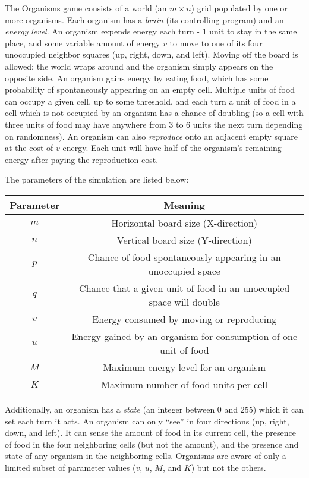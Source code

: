\documentclass[
10pt, %
letterpaper, %
oneside, %
headinclude,footinclude, %
english
]{article}
\begin{document}
The Organisms game consists of a world (an $m \times n$) grid populated by one or more organisms. Each organism has a \textit{brain} (its controlling program) and an \textit{energy level}. An organism expends energy each turn - 1 unit to stay in the same place, and some variable amount of energy $v$ to move to one of its four unoccupied neighbor squares (up, right, down, and left). Moving off the board is allowed; the world wraps around and the organism simply appears on the opposite side. An organism gains energy by eating food, which has some probability of spontaneously appearing on an empty cell. Multiple units of food can occupy a given cell, up to some threshold, and each turn a unit of food in a cell which is not occupied by an organism has a chance of doubling (so a cell with three units of food may have anywhere from 3 to 6 units the next turn depending on randomness). An organism can also \textit{reproduce} onto an adjacent empty square at the cost of $v$ energy. Each unit will have half of the organism's remaining energy after paying the reproduction cost.

The parameters of the simulation are listed below:

\begin{tabular}{|c|c|}
\hline
\textbf{Parameter} & \textbf{Meaning}\\ \hline
$m$ & Horizontal board size (X-direction) \\ \hline
$n$ & Vertical board size (Y-direction) \\ \hline
$p$ & Chance of food spontaneously appearing in an unoccupied space \\ \hline
$q$ & Chance that a given unit of food in an unoccupied space will double \\ \hline
$v$ & Energy consumed by moving or reproducing \\ \hline
$u$ & Energy gained by an organism for consumption of one unit of food \\ \hline
$M$ & Maximum energy level for an organism \\ \hline
$K$ & Maximum number of food units per cell \\ \hline
\end{tabular}

Additionally, an organism has a \textit{state} (an integer between 0 and 255) which it can set each turn it acts. An organism can only ``see'' in four directions (up, right, down, and left). It can sense the amount of food in its current cell, the presence of food in the four neighboring cells (but not the amount), and the presence and state of any organism in the neighboring cells. Organisms are aware of only a limited subset of parameter values ($v$, $u$, $M$, and $K$) but not the others.
\end{document}
